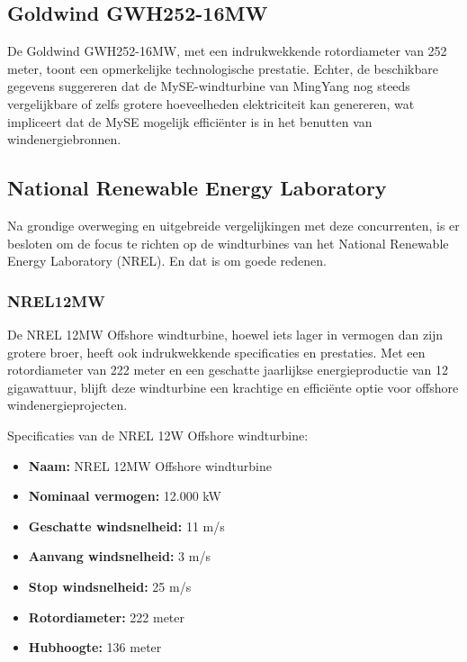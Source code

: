 \subsection{Goldwind GWH252-16MW}
De Goldwind GWH252-16MW, met een indrukwekkende rotordiameter van 252 meter, toont een opmerkelijke technologische prestatie. Echter, de beschikbare gegevens suggereren dat de MySE-windturbine van MingYang nog steeds vergelijkbare of zelfs grotere hoeveelheden elektriciteit kan genereren, wat impliceert dat de MySE mogelijk efficiënter is in het benutten van windenergiebronnen.\cite{Goldwind}\cite{4COffshore}
\subsection{National Renewable Energy Laboratory}
Na grondige overweging en uitgebreide vergelijkingen met deze concurrenten, is er besloten om de focus te richten op de windturbines van het National Renewable Energy Laboratory (NREL). En dat is om goede redenen.\cite{NRELVision}\cite{NRELAwards}
\subsubsection{NREL12MW}
De NREL 12MW Offshore windturbine, hoewel iets lager in vermogen dan zijn grotere broer, heeft ook indrukwekkende specificaties en prestaties. Met een rotordiameter van 222 meter en een geschatte jaarlijkse energieproductie van 12 gigawattuur, blijft deze windturbine een krachtige en efficiënte optie voor offshore windenergieprojecten.\cite{NRELOregonWindStudy}\cite{NRELATB2020}\cite{NRELReference12MW}\cite{NRELCsv12MW}

Specificaties van de NREL 12W Offshore windturbine:
\begin{itemize}
    \item \textbf{Naam:} NREL 12MW Offshore windturbine
    \item \textbf{Nominaal vermogen:} 12.000 kW
    \item \textbf{Geschatte windsnelheid:} 11 m/s
    \item \textbf{Aanvang windsnelheid:} 3 m/s
    \item \textbf{Stop windsnelheid:} 25 m/s
    \item \textbf{Rotordiameter:} 222 meter
    \item \textbf{Hubhoogte:} 136 meter
\end{itemize}



